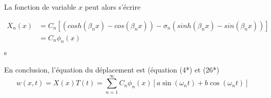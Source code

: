 \documentclass[a4paper,10pt]{article}
\begin{document}
La fonction de variable \begin{math} x  \end{math} peut alors s'écrire 

\begin{equation} 
	\begin{aligned}
			 X_n(x) 	&=	C_ n[ (cosh(\beta_n x) - cos(\beta_n x)) - \sigma_n (sinh(\beta_n x) - sin(\beta_n x))] \\
			  		&=	C_n \phi_n(x) \\
	\end{aligned}
\end{equation}s


En conclusion, l'équation du déplacement est (équation (4*) et (26*)
\begin{equation} \boxed{ w(x,t)= X(x) T(t) = \sum_{n=1}^{\infty} C_n \phi_n(x) [a\sin(\omega_n t) + b\cos(\omega_n t)] } \end{equation}







 
\end{document}

